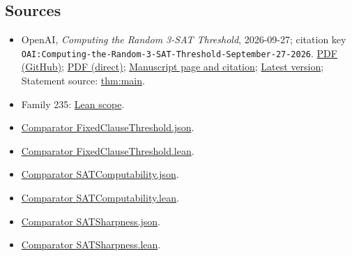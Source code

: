 \documentclass[11pt]{article}
\begin{document}
\subsection{Sources}
\begin{itemize}
\item OpenAI, \emph{Computing the Random 3-SAT Threshold}, 2026-09-27; citation key \texttt{OAI:Computing-the-Random-3-SAT-Threshold-September-27-2026}. \href{https://github.com/openai/math/blob/adc7f1241b42e322a6451854ab7e4b4c146bf78a/preprints/Computing-the-Random-3-SAT-Threshold-September-27-2026/article.pdf}{PDF (GitHub)}; \href{https://github.com/openai/math/raw/adc7f1241b42e322a6451854ab7e4b4c146bf78a/preprints/Computing-the-Random-3-SAT-Threshold-September-27-2026/article.pdf}{PDF (direct)}; \href{https://github.com/openai/math/blob/adc7f1241b42e322a6451854ab7e4b4c146bf78a/preprints/Computing-the-Random-3-SAT-Threshold-September-27-2026/README.md}{Manuscript page and citation}; \href{https://github.com/openai/math/blob/main/preprints/Computing-the-Random-3-SAT-Threshold-September-27-2026/article.pdf}{Latest version}; Statement source: \href{https://github.com/openai/math/blob/adc7f1241b42e322a6451854ab7e4b4c146bf78a/preprints/Computing-the-Random-3-SAT-Threshold-September-27-2026/build/sections/introduction.tex\#L22}{thm:main}.
\item Family 235: \href{https://github.com/openai/math/blob/adc7f1241b42e322a6451854ab7e4b4c146bf78a/lean/docs/235.md}{Lean scope}.
\item \href{https://github.com/openai/math/blob/adc7f1241b42e322a6451854ab7e4b4c146bf78a/lean/ComparatorChallenges/FixedClauseThreshold.json}{Comparator FixedClauseThreshold.json}.
\item \href{https://github.com/openai/math/blob/adc7f1241b42e322a6451854ab7e4b4c146bf78a/lean/ComparatorChallenges/FixedClauseThreshold.lean}{Comparator FixedClauseThreshold.lean}.
\item \href{https://github.com/openai/math/blob/adc7f1241b42e322a6451854ab7e4b4c146bf78a/lean/ComparatorChallenges/SATComputability.json}{Comparator SATComputability.json}.
\item \href{https://github.com/openai/math/blob/adc7f1241b42e322a6451854ab7e4b4c146bf78a/lean/ComparatorChallenges/SATComputability.lean}{Comparator SATComputability.lean}.
\item \href{https://github.com/openai/math/blob/adc7f1241b42e322a6451854ab7e4b4c146bf78a/lean/ComparatorChallenges/SATSharpness.json}{Comparator SATSharpness.json}.
\item \href{https://github.com/openai/math/blob/adc7f1241b42e322a6451854ab7e4b4c146bf78a/lean/ComparatorChallenges/SATSharpness.lean}{Comparator SATSharpness.lean}.

\end{itemize}
\end{document}
